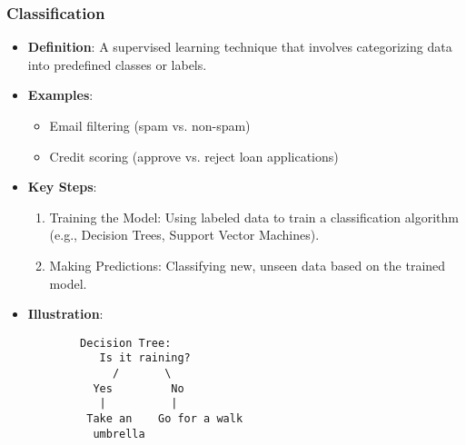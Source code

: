 \documentclass[aspectratio=169]{beamer}
\begin{document}
\begin{frame}[fragile]
    \frametitle{Classification}
    \begin{itemize}
        \item \textbf{Definition}: A supervised learning technique that involves categorizing data into predefined classes or labels.
        \item \textbf{Examples}:
            \begin{itemize}
                \item Email filtering (spam vs. non-spam)
                \item Credit scoring (approve vs. reject loan applications)
            \end{itemize}
        \item \textbf{Key Steps}:
            \begin{enumerate}
                \item Training the Model: Using labeled data to train a classification algorithm (e.g., Decision Trees, Support Vector Machines).
                \item Making Predictions: Classifying new, unseen data based on the trained model.
            \end{enumerate}
        \item \textbf{Illustration}:
        \begin{lstlisting}
        Decision Tree:
           Is it raining?
             /       \
          Yes         No
           |          |
         Take an    Go for a walk
          umbrella
        \end{lstlisting}
    \end{itemize}
\end{frame}
\end{document}
